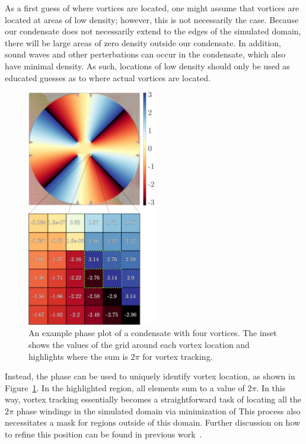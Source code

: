 As a first guess of where vortices are located, one might assume that vortices are located at areas of low density; however, this is not necessarily the case.
Because our condensate does not necessarily extend to the edges of the simulated domain, there will be large areas of zero density outside our condensate.
In addition, sound waves and other perterbations can occur in the condensate, which also have minimal density.
As such, locations of low density should only be used as educated guesses as to where actual vortices are located.

\begin{figure}
\center \includegraphics[width = 0.5\textwidth]{data/gpu/vortex_tracking/phi_grid.png}
\caption{An example phase plot of a condensate with four vortices.
The inset shows the values of the grid around each vortex location and highlights where the sum is $2\pi$ for vortex tracking.
}
\label{fig:phase}
\end{figure}

Instead, the phase can be used to uniquely identify vortex location, as shown in Figure~\ref{fig:phase}.
In the highlighted region, all elements sum to a value of $2\pi$.
In this way, vortex tracking essentially becomes a straightforward task of locating all the $2\pi$ phase windings in the simulated domain via minimization of
This process also necessitates a mask for regions outside of this domain.
Further discussion on how to refine this position can be found in previous work~\cite{o2017, docs}.


